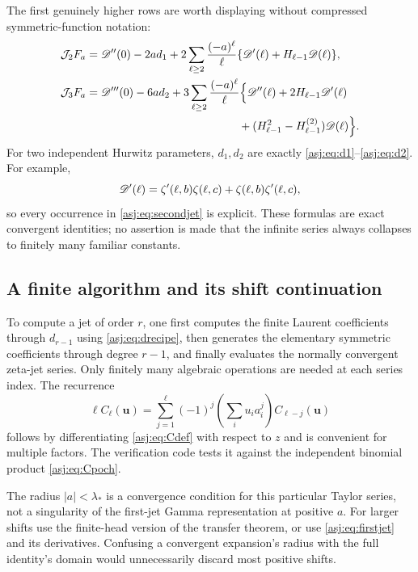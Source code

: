 The first genuinely higher rows are worth displaying without compressed
symmetric-function notation:
\begin{align}\label{asj:eq:secondjet}
 \calJ_2F_a={}&\D''(0)-2a d_1
     +2\sum_{\ell\ge2}\frac{(-a)^\ell}{\ell}
           \{\D'(\ell)+H_{\ell-1}\D(\ell)\},\\
 \calJ_3F_a={}&\D'''(0)-6a d_2
     +3\sum_{\ell\ge2}\frac{(-a)^\ell}{\ell}
        \Big\{\D''(\ell)+2H_{\ell-1}\D'(\ell)\notag\\
        &\hspace{43mm}
        +(H_{\ell-1}^2-H_{\ell-1}^{(2)})\D(\ell)\Big\}.
 \label{asj:eq:thirdjet}
\end{align}
For two independent Hurwitz parameters, $d_1,d_2$ are exactly
\eqref{asj:eq:d1}--\eqref{asj:eq:d2}. For example,
\[
 \mathscr D'(\ell)=\zeta'(\ell,b)\zeta(\ell,c)
                    +\zeta(\ell,b)\zeta'(\ell,c),
\]
so every occurrence in \eqref{asj:eq:secondjet} is explicit. These formulas
are exact convergent identities; no assertion is made that the infinite
series always collapses to finitely many familiar constants.

\subsection{A finite algorithm and its shift continuation}
To compute a jet of order $r$, one first computes the finite Laurent
coefficients through $d_{r-1}$ using \eqref{asj:eq:drecipe}, then generates
the elementary symmetric coefficients through degree $r-1$, and finally
evaluates the normally convergent zeta-jet series. Only finitely many
algebraic operations are needed at each series index. The recurrence
\begin{equation}\label{asj:eq:Crecurrence}
 \ell C_\ell(\boldsymbol u)
     =\sum_{j=1}^{\ell}(-1)^j
         \left(\sum_i u_i a_i^j\right)C_{\ell-j}(\boldsymbol u)
\end{equation}
follows by differentiating \eqref{asj:eq:Cdef} with respect to $z$ and
is convenient for multiple factors. The verification code tests it
against the independent binomial product \eqref{asj:eq:Cpoch}.

The radius $|a|<\lambda_*$ is a convergence condition for this particular
Taylor series, not a singularity of the first-jet Gamma representation at
positive $a$. For larger shifts use the finite-head version of the transfer
theorem, or use \eqref{asj:eq:firstjet} and its derivatives. Confusing a
convergent expansion's radius with the full identity's domain would
unnecessarily discard most positive shifts.
